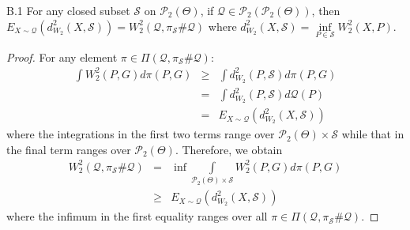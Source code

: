 \setcounter{lemma}{1}
\begin{customlem}{B.1} \label{lemma:one} For any closed subset $\mathcal{S}$ on $\mathcal{P}_{2}(\Theta)$, if $\mathcal{Q} \in \mathcal{P}_{2}(\mathcal{P}_{2}(\Theta))$, then $E_{X \sim \mathcal{Q}} (d_{W_{2}}^{2}(X,\mathcal{S})) = W_2^2 (\mathcal{Q},\pi _\mathcal{S} \# \mathcal{Q})$ where $d_{W_{2}}^{2}(X,\mathcal{S})=\inf \limits_{P \in \mathcal{S}}{W_{2}^{2}(X,P)}$.
\end{customlem}
\begin{proof}
For any element $\pi \in \Pi (\mathcal{Q},\pi _\mathcal{S} \# \mathcal{Q})$:
\begin{eqnarray}
\int{W_{2}^{2}(P,G)} d\pi (P,G) & \geq &  \int {d_{W_{2}}^{2}(P,\mathcal{S})} d\pi (P,G) \nonumber \\
& = & \int {d_{W_{2}}^{2}(P,\mathcal{S})} d\mathcal{Q}(P) \nonumber \\
& = &  E_{X \sim \mathcal{Q}} (d_{W_{2}}^{2}(X,\mathcal{S})) \nonumber
\end{eqnarray}
where the integrations in the first two terms range over $\mathcal{P}_{2}(\Theta)  \times \mathcal{S}$ while that in the final term ranges over $\mathcal{P}_{2}(\Theta)$. Therefore, we obtain 
\begin{eqnarray}
W_2^2 (\mathcal{Q},\pi _\mathcal{S} \# \mathcal{Q}) & = & \mathop {\inf } \int\limits_{\mathcal{P}_{2}(\Theta)  \times \mathcal{S}} {W_{2}^{2}(P,G)} d\pi (P,G) \nonumber \\
& \geq & E_{X \sim \mathcal{Q}} (d_{W_{2}}^{2}(X,\mathcal{S})) \label{eqn:lemmaequationone}
\end{eqnarray}
where the infimum in the first equality ranges over all $\pi \in \Pi (\mathcal{Q},\pi _\mathcal{S} \# \mathcal{Q})$. 


\end{proof}
